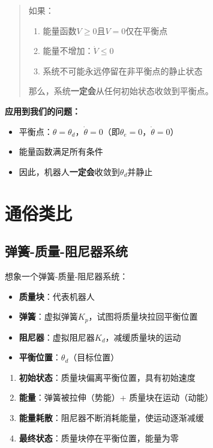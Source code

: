 \documentclass{article}
\begin{document}
\begin{quote}
如果：
\begin{enumerate}
\item 能量函数$V \geq 0$且$V = 0$仅在平衡点
\item 能量不增加：$\dot{V} \leq 0$
\item 系统不可能永远停留在非平衡点的静止状态
\end{enumerate}
那么，系统\textbf{一定会}从任何初始状态收敛到平衡点。
\end{quote}

\textbf{应用到我们的问题：}

\begin{itemize}
\item 平衡点：$\theta = \theta_d$，$\dot{\theta} = 0$（即$\theta_e = 0$，$\dot{\theta} = 0$）
\item 能量函数满足所有条件
\item 因此，机器人\textbf{一定会}收敛到$\theta_d$并静止
\end{itemize}

\section{通俗类比}

\subsection{弹簧-质量-阻尼器系统}

想象一个弹簧-质量-阻尼器系统：

\begin{itemize}
\item \textbf{质量块}：代表机器人
\item \textbf{弹簧}：虚拟弹簧$K_p$，试图将质量块拉回平衡位置
\item \textbf{阻尼器}：虚拟阻尼器$K_d$，减缓质量块的运动
\item \textbf{平衡位置}：$\theta_d$（目标位置）
\end{itemize}

\begin{enumerate}
\item \textbf{初始状态}：质量块偏离平衡位置，具有初始速度
\item \textbf{能量}：弹簧被拉伸（势能）+ 质量块在运动（动能）
\item \textbf{能量耗散}：阻尼器不断消耗能量，使运动逐渐减缓
\item \textbf{最终状态}：质量块停在平衡位置，能量为零
\end{enumerate}
\end{document}
